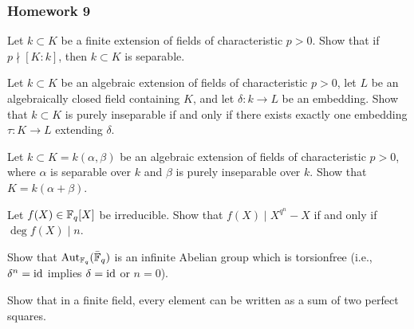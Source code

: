 \subsubsection{Homework 9}
\setcounter{exercise}{0}
\setcounter{equation}{0}

\begin{problem}
  Let $k\subset K$ be a finite extension of fields of characteristic
  $p>0$. Show that if $p\nmid[K:k]$, then $k\subset K$ is separable.
\end{problem}
\begin{solution}
\end{solution}

\begin{problem}
  Let $k\subset K$ be an algebraic extension of fields of characteristic
  $p>0$, let $L$ be an algebraically closed field containing $K$, and let
  $\delta\colon k\to L$ be an embedding. Show that $k\subset K$ is purely
  inseparable if and only if there exists exactly one embedding
  $\tau\colon K\to L$ extending $\delta$.
\end{problem}
\begin{solution}
\end{solution}

\begin{problem}
  Let $k\subset K=k(\alpha,\beta)$ be an algebraic extension of fields of
  characteristic $p>0$, where $\alpha$ is separable over $k$ and $\beta$ is
  purely inseparable over $k$. Show that $K=k(\alpha+\beta)$.
\end{problem}
\begin{solution}
\end{solution}

\begin{problem}
  Let $f(X)\in\mathbb{F}_q[X]$ be irreducible. Show that $f(X)\mid X^{q^n}-X$ if
  and only if $\deg f(X)\mid n$.
\end{problem}
\begin{solution}
\end{solution}

\begin{problem}
  Show that $\operatorname{Aut}_{\mathbb{F}_q}(\bar{\mathbb{F}}_q)$ is an infinite Abelian group which
  is torsionfree (i.e., $\delta^n=\operatorname{id}$ implies $\delta=\operatorname{id}$ or $n=0$).
\end{problem}
\begin{solution}
\end{solution}

\begin{problem}
  Show that in a finite field, every element can be written as a sum of two
  perfect squares.
\end{problem}
\begin{solution}
\end{solution}

